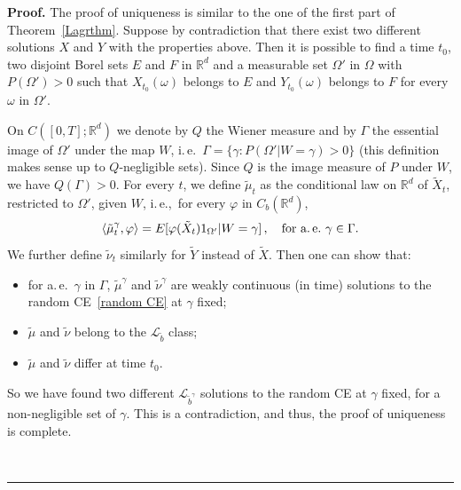 \documentclass[a4paper,10pt]{article}
\newenvironment{proof}[1][Proof]{\noindent\textbf{#1.} }{\ \rule{0.5em}{0.5em}}
\newcommand{\mr}{\mathbb{R}}
\newcommand{\mc}{\mathcal}
\newcommand{\lan}{\langle}
\newcommand{\ran}{\rangle}
\newcommand{\td}{\tilde}
\begin{document}
\begin{proof}
The proof of uniqueness is similar to the one of the first part of Theorem~\ref{Lagrthm}. Suppose by contradiction that there exist two different solutions $X$ and $Y$ with the properties above. Then it is possible to find a time $t_0$, two disjoint Borel sets $E$ and $F$ in $\mr^d$ and a measurable set $\Omega'$ in $\Omega$ with $P(\Omega')>0$ such that $X_{t_0}(\omega)$ belongs to $E$ and $Y_{t_0}(\omega)$ belongs to $F$ for every $\omega$ in $\Omega'$.

On $C([0,T];\mr^d)$ we denote by $Q$ the Wiener measure and by $\Gamma$ the essential image of $\Omega'$ under the map $W$, i.\,e.\ $\Gamma=\{\gamma \colon P(\Omega' | W=\gamma)>0\}$ (this definition makes sense up to $Q$-negligible sets). Since $Q$ is the image measure of $P$ under $W$, we have $Q(\Gamma)>0$. For every $t$, we define $\td{\mu}_t$ as the conditional law on $\mr^d$ of $\td{X}_t$, restricted to $\Omega'$, given $W$, i.\,e.,\ for every $\varphi$ in $C_b(\mr^d)$,
\begin{equation*}
\lan\td{\mu}_t^{\gamma},\varphi\ran= E[\varphi(\td{X}_t)1_{\Omega'}|W=\gamma] \,,\quad \mbox{for a.\,e.\ }\gamma\in\Gamma.
\end{equation*}
We further define $\td{\nu}_t$ similarly for $\td{Y}$ instead of $\td{X}$. Then one can show that:
\begin{itemize}
\item for a.\,e.\ $\gamma$ in $\Gamma$, $\td{\mu}^{\gamma}$ and $\td{\nu}^{\gamma}$ are weakly continuous (in time) solutions to the random CE~\eqref{random CE} at $\gamma$ fixed;
\item $\td{\mu}$ and $\td{\nu}$ belong to the $\mc{L}_{\td{b}}$ class;
\item $\td{\mu}$ and $\td{\nu}$ differ at time $t_0$.
\end{itemize}
So we have found two different $\mc{L}_{\td{b}^{\gamma}}$ solutions to the random CE at $\gamma$ fixed, for a non-negligible set of $\gamma$. This is a contradiction, and thus, the proof of uniqueness is complete.


\end{proof}
\end{document}
